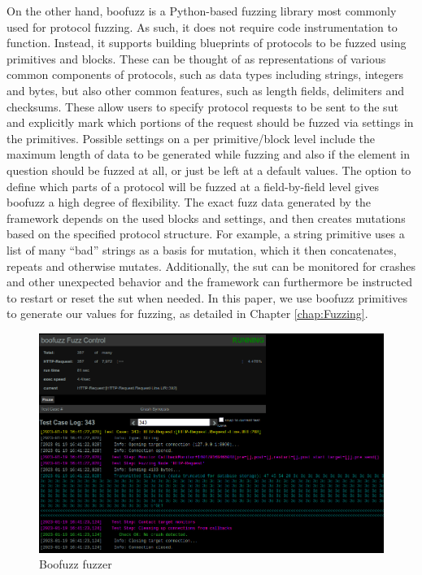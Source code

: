 On the other hand, boofuzz is a Python-based fuzzing library most commonly used for protocol fuzzing. As such, it does not require code instrumentation to function. Instead, it supports building blueprints of protocols to be fuzzed using primitives and blocks. These can be thought of as representations of various common components of protocols, such as data types including strings, integers and bytes, but also other common features, such as length fields, delimiters and checksums. These allow users to specify protocol requests to be sent to the \ac{sut} and explicitly mark which portions of the request should be fuzzed via settings in the primitives. Possible settings on a per primitive/block level include the maximum length of data to be generated while fuzzing and also if the element in question should be fuzzed at all, or just be left at a default values. The option to define which parts of a protocol will be fuzzed at a field-by-field level gives boofuzz a high degree of flexibility. The exact fuzz data generated by the framework depends on the used blocks and settings, and then creates mutations based on the specified protocol structure. For example, a string primitive uses a list of many ``bad'' strings as a basis for mutation, which it then concatenates, repeats and otherwise mutates. Additionally, the \ac{sut} can be monitored for crashes and other unexpected behavior and the framework can furthermore be instructed to restart or reset the \ac{sut} when needed. In this paper, we use boofuzz primitives to generate our values for fuzzing, as detailed in Chapter \ref{chap:Fuzzing}.

\begin{figure}
	\centering
	\includegraphics[width=0.9\linewidth]{images/boofuzz_control_center}
	\caption{Boofuzz fuzzer}
	\label{fig:boofuzzcontrolcenter}
\end{figure}

